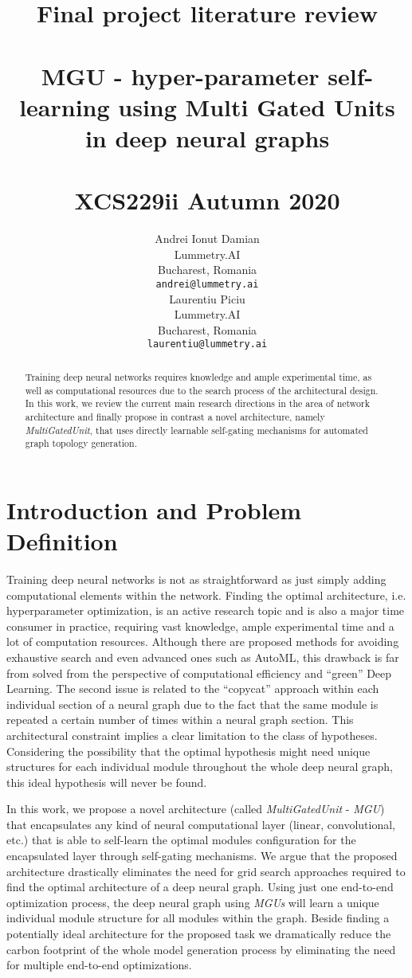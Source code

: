 \documentclass[11pt,a4paper]{article}
\title{
Final project literature review \\~\\
  \large MGU - hyper-parameter self-learning using Multi Gated Units in deep neural graphs \\~\\
  XCS229ii Autumn 2020}
\author{Andrei Ionut Damian \\
  Lummetry.AI \\
  Bucharest, Romania \\
  \texttt{andrei@lummetry.ai} \\\And
  Laurentiu Piciu \\
  Lummetry.AI \\
  Bucharest, Romania \\
  \texttt{laurentiu@lummetry.ai} \\}
\date{}
\begin{document}
\maketitle
\begin{abstract}
Training deep neural networks requires knowledge and ample experimental time, as well as computational resources due to the search process of the architectural design. In this work, we review the current main research directions in the area of network architecture and finally propose in contrast a novel architecture, namely \textit{MultiGatedUnit}, that uses directly learnable self-gating mechanisms for automated graph topology generation.
\end{abstract}

\section{Introduction and Problem Definition}

Training deep neural networks is not as straightforward as just simply adding computational elements within the network. Finding the optimal architecture, i.e. hyperparameter optimization, is an active research topic and is also a major time consumer in practice, requiring vast knowledge, ample experimental time and a lot of computation resources.  Although there are proposed methods for avoiding exhaustive search and even advanced ones such as AutoML, this drawback is far from solved from the perspective of computational efficiency and “green” Deep Learning. The second issue is related to the “copycat” approach within each individual section of a neural graph due to the fact that the same module is repeated a certain number of times within a neural graph section. This architectural constraint implies a clear limitation to the class of hypotheses. Considering the possibility that the optimal hypothesis might need unique structures for each individual module throughout the whole deep neural graph, this ideal hypothesis will never be found.

In this work, we propose a novel architecture (called \textit{MultiGatedUnit} - \textit{MGU}) that encapsulates any kind of neural computational layer (linear, convolutional, etc.) that is able to self-learn the optimal modules configuration for the encapsulated layer through self-gating mechanisms.  We argue that the proposed architecture drastically eliminates the need for grid search approaches required to find the optimal architecture of a deep neural graph.  Using just one end-to-end optimization process, the deep neural graph using \textit{MGUs} will learn a unique individual module structure for all modules within the graph. Beside finding a potentially ideal architecture for the proposed task we dramatically reduce the carbon footprint of the whole model generation process by eliminating the need for multiple end-to-end optimizations.
\end{document}
